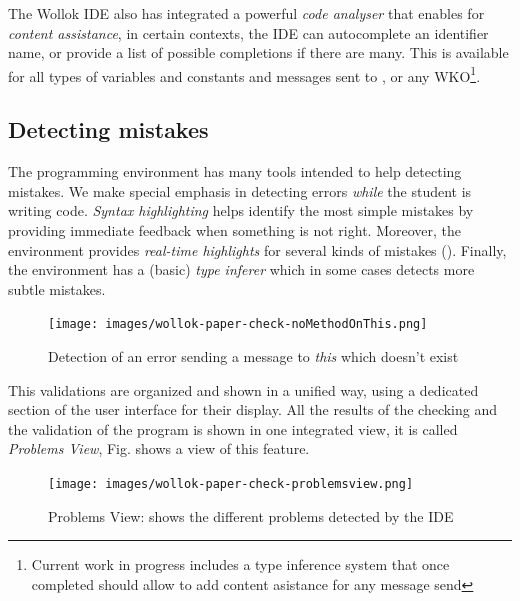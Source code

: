The Wollok IDE also has integrated a powerful \emph{code analyser} that enables for \emph{content assistance}, 
\ie in certain contexts, the IDE can autocomplete an identifier name, or provide a list of possible completions if there are many.
This is available for all types of variables and constants and messages sent to ,  or any WKO\footnote{Current work in progress includes a type inference system that once completed should allow to add content asistance for any message send}. 
 
\subsection{Detecting mistakes}
The programming environment has many tools intended to help detecting mistakes.
We make special emphasis in detecting errors \emph{while} the student is writing code. 
\emph{Syntax highlighting} helps identify the most simple mistakes by providing immediate feedback when something is not right. 
Moreover, the environment provides \emph{real-time highlights} for several kinds of mistakes (\cf {}).
Finally, the environment has a (basic) \emph{type inferer} which in some cases detects more subtle mistakes.

\begin{figure}[ht]
    \centering
	\texttt{[image: images/wollok-paper-check-noMethodOnThis.png]}
    \caption{Detection of an error sending a message to \emph{this} which doesn't exist}
    \label{fig:check-noMethodOnThis.png}
\end{figure}


This validations are organized and shown in a unified way, using a dedicated section of the user interface for their display.
All the results of the checking and the validation of the program is shown in one integrated view, it is called \emph{Problems View}, Fig.  shows a view of this feature. 

\begin{figure}[ht]
    \centering
	\texttt{[image: images/wollok-paper-check-problemsview.png]}
    \caption{Problems View: shows the different problems detected by the IDE }
    \label{fig:problemsview.png}
\end{figure}

